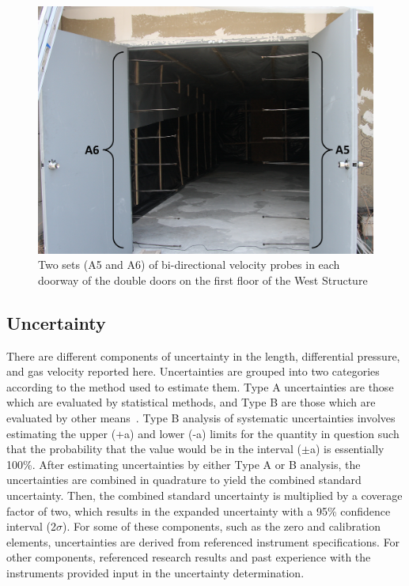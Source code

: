 \documentclass[12pt,oneside]{book}
\begin{document}
\begin{figure}[!ht]
\includegraphics[width=6in]{../Pictures/BDPs}
\caption[Sets of Bi-directional Velocity Probes in Doorway of West Structure]{Two sets (A5 and A6) of bi-directional velocity probes in each doorway of the double doors on the first floor of the West Structure}
\label{fig:BDPs}
\end{figure}

\subsection{Uncertainty}
\label{subsec:uncertainty}
There are different components of uncertainty in the length, differential pressure, and gas velocity reported here. Uncertainties are grouped into two categories according to the method used to estimate them. Type A uncertainties are those which are evaluated by statistical methods, and Type B are those which are evaluated by other means~\cite{Taylor&Kuyatt:1994}. Type B analysis of systematic uncertainties involves estimating the upper (+a) and lower (-a) limits for the quantity in question such that the probability that the value would be in the interval ($\pm$a) is essentially 100\%. After estimating uncertainties by either Type A or B analysis, the uncertainties are combined in quadrature to yield the combined standard uncertainty. Then, the combined standard uncertainty is multiplied by a coverage factor of two, which results in the expanded uncertainty with a 95\% confidence interval (2$\sigma$). For some of these components, such as the zero and calibration elements, uncertainties are derived from referenced instrument specifications. For other components, referenced research results and past experience with the instruments provided input in the uncertainty determination. 
\end{document}
